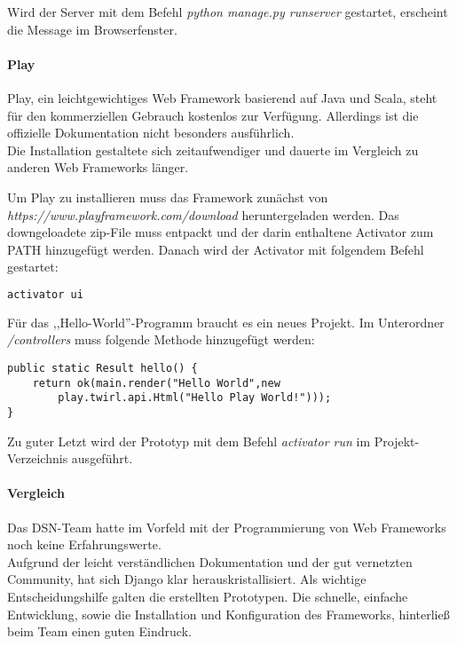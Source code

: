 Wird der Server mit dem Befehl \textit{python manage.py runserver} gestartet, erscheint die Message im Browserfenster.

\paragraph{Play}
Play, ein leichtgewichtiges Web Framework basierend auf Java und Scala, steht für den kommerziellen Gebrauch kostenlos zur Verfügung. Allerdings ist die offizielle Dokumentation nicht besonders ausführlich.\\
Die Installation gestaltete sich zeitaufwendiger und dauerte im Vergleich zu anderen Web Frameworks länger.\cite{PLAY}

Um Play zu installieren muss das Framework zunächst von\\
\textit{https://www.playframework.com/download} heruntergeladen werden. Das downgeloadete zip-File muss entpackt und der darin enthaltene Activator zum PATH hinzugefügt werden. Danach wird der Activator mit folgendem Befehl gestartet\cite{PLAYCON}:
\begin{lstlisting}[caption={Konifiguration von Play \cite{PLAYCON}}, language=bash]
activator ui
\end{lstlisting}

Für das ,,Hello-World''-Programm braucht es ein neues Projekt. Im Unterordner \textit{/controllers} muss folgende Methode hinzugefügt werden:

\begin{lstlisting}[caption={Play Hello-World \cite{PLAYCON}}]
public static Result hello() {
	return ok(main.render("Hello World",new
		play.twirl.api.Html("Hello Play World!")));
}
\end{lstlisting}

Zu guter Letzt wird der Prototyp mit dem Befehl \textit{activator run} im Projekt-Verzeichnis ausgeführt.

\paragraph{Vergleich}
Das DSN-Team hatte im Vorfeld mit der Programmierung von Web Frameworks noch keine Erfahrungswerte. \\
Aufgrund der leicht verständlichen Dokumentation und der gut vernetzten Community, hat sich Django klar herauskristallisiert. Als wichtige Entscheidungshilfe galten die erstellten Prototypen. Die schnelle, einfache Entwicklung, sowie die Installation und Konfiguration des Frameworks, hinterließ beim Team einen guten Eindruck.

